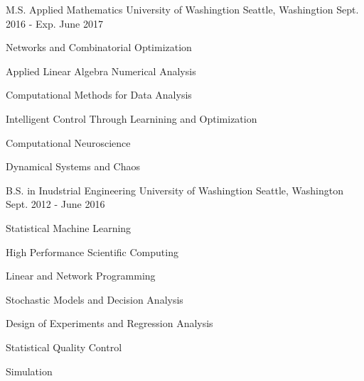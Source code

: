 

\begin{cventries}

  \cventry
    {M.S. Applied Mathematics} %
    {University of Washingtion} %
    {Seattle, Washingtion} %
    {Sept. 2016 - Exp. June 2017} %
    {
      \begin{cvitems} %
        \vspace*{-3mm}
        \begin{multicols}{2}
          \item {Networks and Combinatorial Optimization}
          \item {Applied Linear Algebra Numerical Analysis}
          \item {Computational Methods for Data Analysis}
          \item {Intelligent Control Through Learnining and Optimization}
          \item {Computational Neuroscience}
          \item {Dynamical Systems and Chaos}
        \end{multicols}
      \end{cvitems}
      \vspace*{-2mm}
    }
  \cventry
    {B.S. in Inudstrial Engineering} %
    {University of Washingtion} %
    {Seattle, Washington} %
    {Sept. 2012 - June 2016} %
    {
      \begin{cvitems} %
        \vspace*{-3mm}
        \begin{multicols}{2}
          \item {Statistical Machine Learning}
          \item {High Performance Scientific Computing}
          \item {Linear and Network Programming}
          \item {Stochastic Models and Decision Analysis}
          \item {Design of Experiments and Regression Analysis}
          \item {Statistical Quality Control}
          \item {Simulation}
        \end{multicols}
      \end{cvitems}
      \vspace*{-2mm}
    }


\end{cventries}
